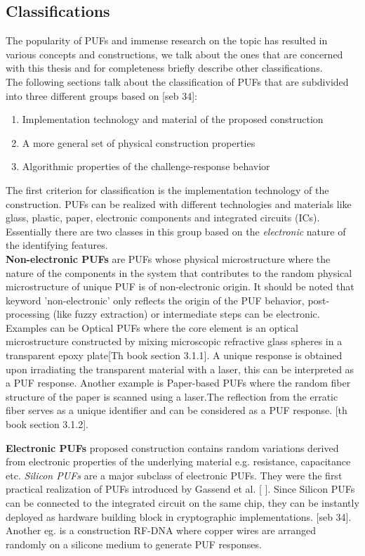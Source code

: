 \subsection{Classifications}
The popularity of PUFs and immense research on the topic has resulted in various concepts and constructions, we talk about the ones that are concerned with this thesis and for completeness briefly describe other classifications.\\
The following sections talk about the classification of PUFs that are subdivided into three different groups based on [seb 34]:
\begin{enumerate}
	\item Implementation technology and material of the proposed construction
	\item A more general set of physical construction properties
	\item Algorithmic properties of the challenge-response behavior
\end{enumerate}

The first criterion for classification is the implementation technology of the construction. PUFs can be realized with different technologies and materials like glass, plastic, paper, electronic components and integrated circuits (ICs). Essentially there are two classes in this group based on the \emph{electronic} nature of the identifying features.\\

\textbf{Non-electronic PUFs} are PUFs whose physical microstructure where the nature of the components in the system that contributes to the random physical microstructure of unique PUF is of non-electronic origin. It should be noted that keyword 'non-electronic' only reflects the origin of the PUF behavior, post-processing (like fuzzy extraction) or intermediate steps can be electronic. Examples can be Optical PUFs where the core element is an optical microstructure constructed by mixing
microscopic refractive glass spheres in a transparent epoxy plate[Th book section 3.1.1]. A unique response is obtained upon irradiating the transparent material with a laser, this can be interpreted as a PUF response. Another example is Paper-based PUFs where the random fiber structure of the paper is scanned using a laser.The reflection from the erratic fiber serves as a unique identifier and can be considered as a PUF response. [th book section 3.1.2].

\textbf{Electronic PUFs} proposed construction contains random variations derived from electronic properties of the underlying material e.g. resistance, capacitance etc. \emph{Silicon PUFs} are a major subclass of electronic PUFs. They were the first practical realization of PUFs introduced by Gassend et al. [ ]. Since Silicon PUFs can be connected to the integrated circuit on the same chip, they can be instantly deployed as hardware building block in cryptographic implementations. [seb 34].
Another eg. is a construction RF-DNA where copper wires are arranged randomly on a silicone medium to generate PUF responses.\\

